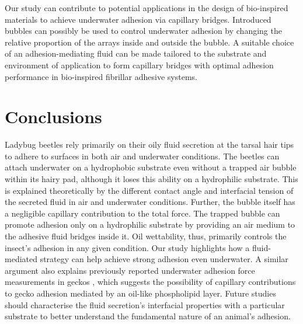 \documentclass[vruler,JEB]{COB}%
\providecommand{\DIFadd}[1]{{\protect\color{blue}\uwave{#1}}} %
\providecommand{\DIFaddbegin}{} %
\providecommand{\DIFaddend}{} %
\providecommand{\DIFdelbegin}{} %
\providecommand{\DIFdelend}{} %
\begin{document}
Our study can contribute to potential applications in the design of bio-inspired materials to achieve underwater adhesion
via capillary bridges. Introduced bubbles can possibly be used to control underwater
adhesion by changing the relative proportion of the arrays inside
and outside the bubble. A suitable choice of an adhesion-mediating fluid can be
made tailored to the substrate and environment of application to form capillary bridges with 
optimal adhesion performance in bio-inspired fibrillar adhesive systems.

\section{Conclusions}

Ladybug beetles rely primarily on their oily fluid secretion at the tarsal hair tips to adhere
to surfaces in both air and underwater conditions. The beetles can
attach underwater on a hydrophobic substrate even without a trapped
air bubble within its hairy pad, although it loses this ability on
a hydrophilic substrate. This is explained theoretically by the different
contact angle and interfacial tension of the secreted fluid in air
and underwater conditions. Further, the bubble itself has a negligible
capillary contribution \DIFaddbegin \DIFadd{(less than 3\%) }\DIFaddend to the total force. The trapped bubble can
promote adhesion only on a hydrophilic substrate by providing an air
medium to the adhesive fluid bridges inside it. Oil wettability, thus,
primarily controls the insect's adhesion in any given condition. 
Our study highlights how a fluid-mediated strategy can help achieve strong adhesion even underwater. A
similar argument also explains previously reported underwater adhesion force measurements
in geckos \citep{RN15}, which suggests the possibility of capillary
contributions to gecko adhesion mediated by an oil-like phospholipid layer. Future studies should characterise
the fluid secretion's interfacial properties with a particular substrate
to better understand the fundamental nature of an animal's adhesion.


\DIFdelbegin %
\DIFdelend \DIFaddbegin {} 
\DIFaddend 
\end{document}
